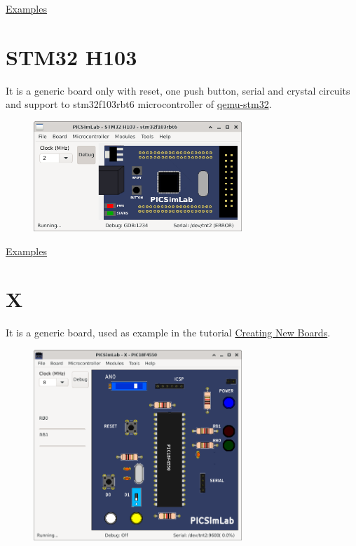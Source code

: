 \href{https://lcgamboa.github.io/picsimlab_examples/board_gpboard.html}{Examples}


\section{STM32 H103}

It is a generic board only with reset, one push button, serial and crystal circuits and support to stm32f103rbt6 microcontroller of 
\href{https://beckus.github.io/qemu_stm32/}{qemu-stm32}.

\begin{figure}[H]
\center
\includegraphics[width=0.7\textwidth]{img/STM32_H103.png} 
\end{figure} 

\href{https://lcgamboa.github.io/picsimlab_examples/board_STM32_H103.html}{Examples}


\section{X}

It is a generic board, used as example in the tutorial 
\href{https://lcgamboa.github.io/picsimlab_docs/stable/CreatingNewBoards.html}{Creating New Boards}.

\begin{figure}[H]
\center
\includegraphics[width=0.7\textwidth]{img/X.png} 
\end{figure} 

